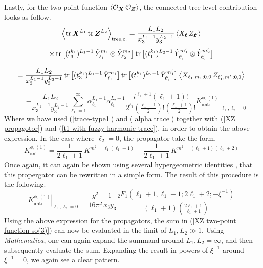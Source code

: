 %
%
Lastly, for the two-point function $\expval{\mathcal{O}_{\boldsymbol{X}} \, \mathcal{O}_{\boldsymbol{Z}}}$, the connected tree-level contribution looks as follow.
%
%
\begin{equation*}
\expval{\tr \boldsymbol{X}^{L_1} \tr \boldsymbol{Z}^{L_2}}_{\mathrm{tree,c.}}
=
\frac{L_1 L_2}{x_3^{L_1-1} y_3^{L_2-1}}
\expval{
X_{\boldsymbol{\ell}} \, 
Z_{\boldsymbol{\ell}'}
}
\end{equation*}
%
%
\begin{equation*}
\times
\tr \big[ (t_3^{k_1})^{L_1 - 1} \, \hat{Y}_{\ell_1}^{m_1} \otimes \hat{Y}_{\ell_2}^{m_2} \big] 
\tr \big[ (t_1^{k_1})^{L_2 - 1} \, \hat{Y}_{\ell_1'}^{m_1'} \otimes \hat{Y}_{\ell_2'}^{m_2'} \big]
\end{equation*}
%
%

%
%
\begin{equation*}
= \frac{L_1 L_2}{x_3^{L_1-1} y_3^{L_2-1}}
\tr \big[ (t_3^{k_1})^{L_1 - 1} \, \hat{Y}_{\ell_1}^{m_1} \big] 
\tr \big[ (t_1^{k_1})^{L_2 - 1} \, \hat{Y}_{\ell_1'}^{m_1'} \big]
\expval{
X_{\ell_1,m_1;0,0} \,
Z_{\ell_1',m_1';0,0}
}
\end{equation*}
%
%

%
%
\begin{equation}\label{XZ two-point function so(3)}
= -\frac{L_1 L_2}{x_3^{L_1-1} y_3^{L_2-1}}
\sum_{\ell_1 = 1}^{\infty}
\alpha_{\ell_1}^{L_1 - 1}
\alpha_{\ell_1}^{L_2 - 1}
\frac{i^{\ell_1+1} (\ell_1 + 1)!}
{2^{\ell_1} \left( \frac{\ell_1 - 1}{2} \right)!
\left( \frac{\ell_1 + 1}{2} \right)!}
\left.
K^{\phi,(1)}_{\mathrm{anti}}
\right|_{\ell_1, \ell_2 = 0}
\end{equation}
%
%
Where we have used (\ref{trace-type1}) and (\ref{alpha trace}) together with (\ref{XZ propagotor}) and (\ref{t1 with fuzzy harmonic trace}), in order to obtain the above expression. In the case where $\ell_2 = 0$, the propagator take the form.
%
%
\begin{equation}
K^{\phi,(1)}_{\mathrm{anti}}
=
\frac{1}{2 \ell_1 + 1} \, K^{m^2 = \ell_1 (\ell_1 - 1)}
-
\frac{1}{2 \ell_1 + 1} \, K^{m^2 = (\ell_1 + 1) (\ell_1 + 2)}
\end{equation}
%
%
Once again, it can again be shown using several hypergeometric identities \cite{Two-point functions in D5-D3}, that this propergator can be rewritten in a simple form. The result of this procedure is the following.
%
%
\begin{equation}
\left.
K^{\phi,(1)}_{\mathrm{anti}}
\right|_{\ell_1, \ell_2 = 0}
=
\frac{g^2}{16 \pi^2} \frac{1}{x_3 y_3} \frac{{}_2 F_1(\ell_1 + 1, \ell_1 + 1; 2 \ell_1 + 2; -\xi^{-1})}{(\ell_1 + 1) \binom{2 \ell_1 + 1}{\ell_1 + 1}}
\end{equation}
%
%
Using the above expression for the propagators, the sum in (\ref{XZ two-point function so(3)}) can now be evaluated in the limit of $L_1, L_2 \gg 1$. Using \textit{Mathematica}, one can again expand the summand around $L_1, L_2 = \infty$, and then subsequently evaluate the sum. Expanding the result in powers of $\xi^{-1}$ around $\xi^{-1} = 0$, we again see a clear pattern.

